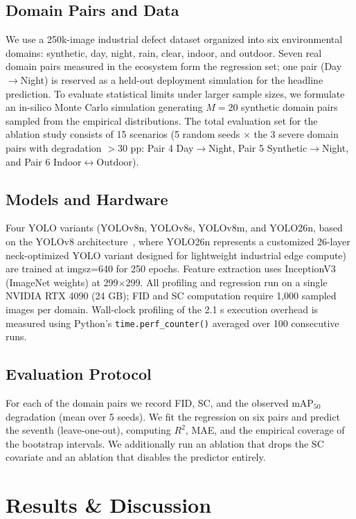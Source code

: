 \documentclass[10pt,twocolumn,letterpaper]{article}
\begin{document}
\subsection{Domain Pairs and Data}
We use a 250k-image industrial defect dataset organized into six environmental domains: synthetic, day, night, rain, clear, indoor, and outdoor. Seven real domain pairs measured in the ecosystem form the regression set; one pair (Day$\rightarrow$Night) is reserved as a held-out deployment simulation for the headline prediction. To evaluate statistical limits under larger sample sizes, we formulate an in-silico Monte Carlo simulation generating $M=20$ synthetic domain pairs sampled from the empirical distributions. The total evaluation set for the ablation study consists of 15 scenarios (5 random seeds $\times$ the 3 severe domain pairs with degradation $> 30$ pp: Pair 4 Day$\rightarrow$Night, Pair 5 Synthetic$\rightarrow$Night, and Pair 6 Indoor$\leftrightarrow$Outdoor).


\subsection{Models and Hardware}
Four YOLO variants (YOLOv8n, YOLOv8s, YOLOv8m, and YOLO26n, based on the YOLOv8 architecture~\cite{jocher2023yolo}, where YOLO26n represents a customized 26-layer neck-optimized YOLO variant designed for lightweight industrial edge compute) are trained at imgsz=640 for 250 epochs. Feature extraction uses InceptionV3 (ImageNet weights) at 299$\times$299. All profiling and regression run on a single NVIDIA RTX 4090 (24 GB); FID and SC computation require 1,000 sampled images per domain. Wall-clock profiling of the 2.1 s execution overhead is measured using Python's \texttt{time.perf\_counter()} averaged over 100 consecutive runs.


\subsection{Evaluation Protocol}
For each of the domain pairs we record FID, SC, and the observed mAP$_{50}$ degradation (mean over 5 seeds). We fit the regression on six pairs and predict the seventh (leave-one-out), computing $R^2$, MAE, and the empirical coverage of the bootstrap intervals. We additionally run an ablation that drops the SC covariate and an ablation that disables the predictor entirely.

\section{Results \& Discussion}
\end{document}

